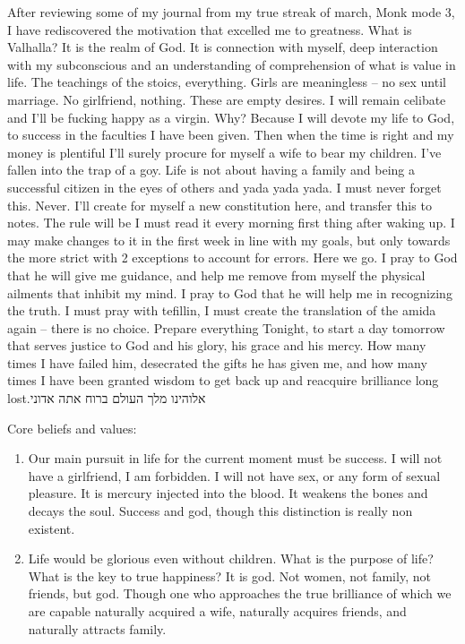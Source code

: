 After reviewing some of my journal from my true streak of march, Monk
mode 3, I have rediscovered the motivation that excelled me to
greatness. What is Valhalla? It is the realm of God. It is connection
with myself, deep interaction with my subconscious and an understanding
of comprehension of what is value in life. The teachings of the stoics,
everything. Girls are meaningless -- no sex until marriage. No
girlfriend, nothing. These are empty desires. I will remain celibate and
I'll be fucking happy as a virgin. Why? Because I will devote my life to
God, to success in the faculties I have been given. Then when the time
is right and my money is plentiful I'll surely procure for myself a wife
to bear my children. I've fallen into the trap of a goy. Life is not
about having a family and being a successful citizen in the eyes of
others and yada yada yada. I must never forget this. Never. I'll create
for myself a new constitution here, and transfer this to notes. The rule
will be I must read it every morning first thing after waking up. I may
make changes to it in the first week in line with my goals, but only
towards the more strict with 2 exceptions to account for errors. Here we
go. I pray to God that he will give me guidance, and help me remove from
myself the physical ailments that inhibit my mind. I pray to God that he
will help me in recognizing the truth. I must pray with tefillin, I must
create the translation of the amida again -- there is no choice. Prepare
everything Tonight, to start a day tomorrow that serves justice to God
and his glory, his grace and his mercy. How many times I have failed
him, desecrated the gifts he has given me, and how many times I have
been granted wisdom to get back up and reacquire brilliance long
lost.אלוהינו מלך העולם ברוח אתה אדוני

Core beliefs and values:

\begin{enumerate}
\def\labelenumi{\arabic{enumi}.}
\item
  Our main pursuit in life for the current moment must be success. I
  will not have a girlfriend, I am forbidden. I will not have sex, or
  any form of sexual pleasure. It is mercury injected into the blood. It
  weakens the bones and decays the soul. Success and god, though this
  distinction is really non existent.
\item
  Life would be glorious even without children. What is the purpose of
  life? What is the key to true happiness? It is god. Not women, not
  family, not friends, but god. Though one who approaches the true
  brilliance of which we are capable naturally acquired a wife,
  naturally acquires friends, and naturally attracts family.
\end{enumerate}

